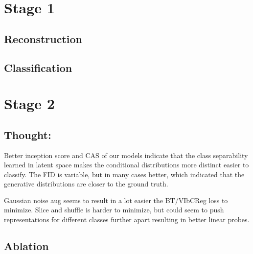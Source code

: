 \documentclass[../../thesis.tex]{subfiles}
\begin{document}
\section{Stage 1}

\subsection{Reconstruction}



\subsection{Classification}
\section{Stage 2}


\subsection{Thought:}

Better inception score and CAS of our models indicate that the class separability learned in latent space makes the conditional distributions more distinct easier to classify. The FID is variable, but in many cases better, which indicated that the generative distributions are closer to the ground truth.\newline

Gaussian noise aug seems to result in a lot easier the BT/VIbCReg loss to minimize. \newline
Slice and shuffle is harder to minimize, but could seem to push representations for different classes further apart resulting in better linear probes.\newline




\subsection{Ablation}
\end{document}
